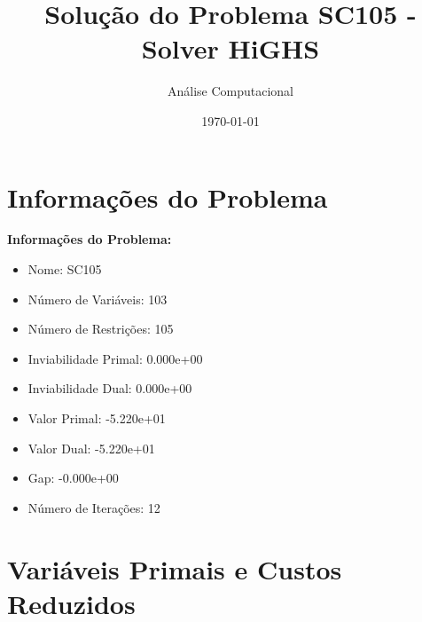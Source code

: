 \documentclass[12pt]{article}
\title{Solução do Problema SC105 - Solver HiGHS}
\author{Análise Computacional}
\date{\today}
\begin{document}
\maketitle

\section{Informações do Problema}

\textbf{Informações do Problema:}
\begin{itemize}
\item Nome: SC105
\item Número de Variáveis: 103
\item Número de Restrições: 105
\item Inviabilidade Primal: 0.000e+00
\item Inviabilidade Dual: 0.000e+00
\item Valor Primal: -5.220e+01
\item Valor Dual: -5.220e+01
\item Gap: -0.000e+00
\item Número de Iterações: 12
\end{itemize}


\section{Variáveis Primais e Custos Reduzidos}
\end{document}
